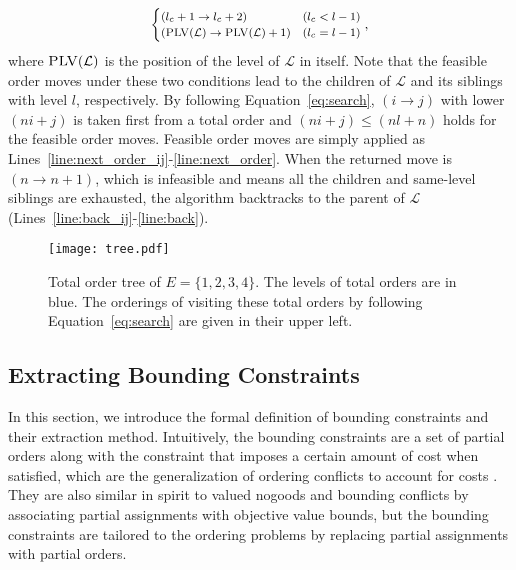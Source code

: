 \documentclass[letterpaper]{article} %
\theoremstyle{definition}
\newcommand{\LE}{\mathcal{L}}
\begin{document}
\begin{equation}\footnotesize
\label{eq:search}
\begin{cases} 
      (l_c + 1 \rightarrow l_c + 2) & (l_c < l -1) \\
      (\textsc{PLV}(\LE) \rightarrow  \textsc{PLV}(\LE)+ 1) & (l_c = l -1)
 \end{cases},
\end{equation}
where $\textsc{PLV}(\LE)$ is the position of the level of $\LE$ in itself. Note that the feasible order moves under these two conditions lead to the children of $\LE$ and its siblings with level $l$, respectively. By following Equation~\ref{eq:search}, $(i \rightarrow j)$ with lower $(ni+j)$ is taken first from a total order and $(ni+j) \leq (nl+n)$ holds for the feasible order moves. Feasible order moves are simply applied as Lines~\ref{line:next_order_ij}-\ref{line:next_order}. When the returned move is $(n \rightarrow n+1)$, which is infeasible and means all the children and same-level siblings are exhausted, the algorithm backtracks to the parent of $\LE$ (Lines~\ref{line:back_ij}-\ref{line:back}).

\begin{figure}[t!]
\centering
\texttt{[image: tree.pdf]}
\caption{Total order tree of $E = \{1,2,3,4\}$. The levels of total orders are in blue. The orderings of visiting these total orders by following Equation~\ref{eq:search} are given in their upper left.}
\label{fig:tree}
\vspace{-10pt}
\end{figure}

\subsection{Extracting Bounding Constraints}
\label{sec:approach:extract}
In this section, we introduce the formal definition of bounding constraints and their extraction method. Intuitively, the bounding constraints are a set of partial orders along with the constraint that imposes a certain amount of cost when satisfied, which are the generalization of ordering conflicts to account for costs \cite{chen2019efficiently}. They are also similar in spirit to valued nogoods \cite{dago1996nogood} and bounding conflicts  \cite{timmons2020best} by associating partial assignments with objective value bounds, but the bounding constraints are tailored to the ordering problems by replacing partial assignments with partial orders.
\end{document}

